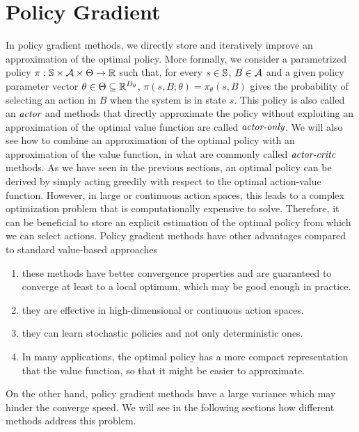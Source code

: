 \section{Policy Gradient}
In policy gradient methods, we directly store and iteratively improve an 
approximation of the optimal policy. More formally, we consider a parametrized
policy $\pi: \S \times \calA \times \Theta \to \R$ such that, for every $s \in
\S$, $B \in \calA$ and a given policy parameter vector $\theta \in \Theta
\subseteq \R^{D_\theta}$, $\pi(s, B; \theta) = \pi_\theta(s, B)$ gives the
probability of selecting an action in $B$ when the system is in state $s$. This
policy is also called an $\emph{actor}$ and methods that directly approximate
the policy without exploiting an approximation of the optimal value function are 
called $\emph{actor-only}$. We will also see how to combine an approximation of 
the optimal policy with an approximation of the value function, in what are
commonly called $\emph{actor-critc}$ methods. As we have seen in the previous
sections, an optimal policy can be derived by simply acting greedily with
respect to the optimal action-value function. However, in large or continuous 
action spaces, this leads to a complex optimization problem that is 
computationally expensive to solve. Therefore, it can be beneficial to store an
explicit estimation of the optimal policy from which we can select actions.
Policy gradient methods have other advantages compared to standard value-based
approaches
\begin{enumerate}[label={\roman*)}]
	\item these methods have better convergence properties and are guaranteed
		to converge at least to a local optimum, which may be good enough in
		practice.  
	\item they are effective in high-dimensional or continuous action spaces.
	\item they can learn stochastic policies and not only deterministic ones.
	\item In many applications, the optimal policy has a more compact
		representation that the value function, so that it might be easier to
		approximate. 
\end{enumerate}
On the other hand, policy gradient methods have a large variance which may
hinder the converge speed. We will see in the following sections how different 
methods address this problem.  

